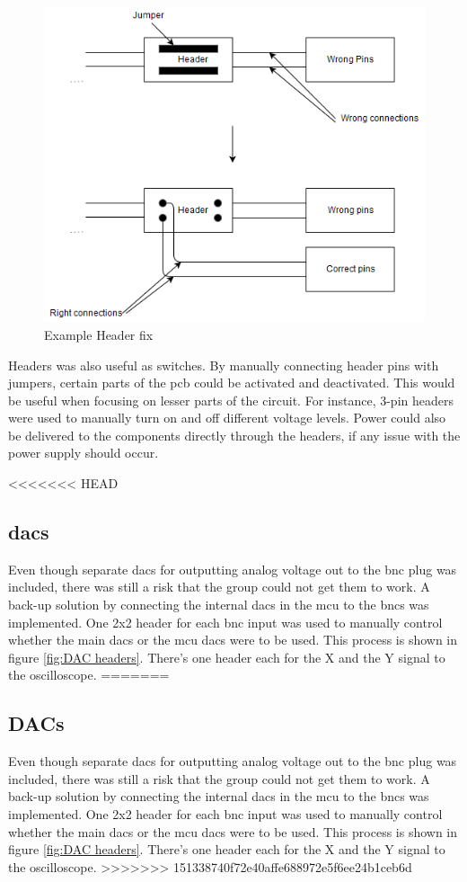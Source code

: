 \begin{figure}[h!]
\centering
\includegraphics[scale = 0.45]{images/Header_fix.png}
\caption{Example Header fix}
\label{fig:Header fix}
\end{figure}

Headers was also useful as switches.
By manually connecting header pins with jumpers, certain parts of the \gls{pcb} could be activated and deactivated.
This would be useful when focusing on lesser parts of the circuit.
For instance, 3-pin headers were used to manually turn on and off different voltage levels.
Power could also be delivered to the components directly through the headers, if any issue with the power supply should occur.

<<<<<<< HEAD
\subsection{\gls{dac}s}
Even though separate \gls{dac}s for outputting analog voltage out to the \gls{bnc} plug was included, there was still a risk that the group could not get them to work. 
A back-up solution by connecting the internal \gls{dac}s in the \gls{mcu} to the \gls{bnc}s was implemented. 
One 2x2 header for each \gls{bnc} input was used to manually control whether the main \gls{dac}s or the \gls{mcu} \gls{dac}s were to be used. 
This process is shown in figure \ref{fig:DAC headers}. 
There's one header each for the X and the Y signal to the oscilloscope. 
=======
\subsection{DACs}
Even though separate \gls{dac}s for outputting analog voltage out to the \gls{bnc} plug was included, there was still a risk that the group could not get them to work.
A back-up solution by connecting the internal \gls{dac}s in the \gls{mcu} to the \gls{bnc}s was implemented.
One 2x2 header for each \gls{bnc} input was used to manually control whether the main \gls{dac}s or the \gls{mcu} \gls{dac}s were to be used.
This process is shown in figure \ref{fig:DAC headers}.
There's one header each for the X and the Y signal to the oscilloscope.
>>>>>>> 151338740f72e40affe688972e5f6ee24b1ceb6d

